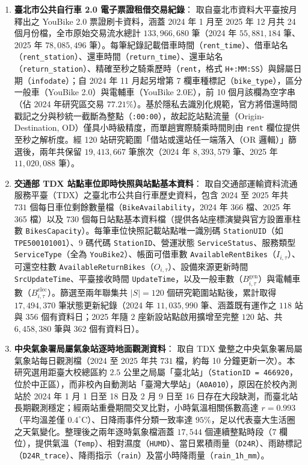 \begin{enumerate}
    \item \textbf{臺北市公共自行車 2.0 電子票證租借交易紀錄}：
    取自臺北市資料大平臺按月釋出之 YouBike 2.0 票證刷卡資料，涵蓋 2024 年 1 月至 2025 年 12 月共 24 個月份檔，全市原始交易流水總計 $133{,}966{,}680$ 筆（2024 年 $55{,}881{,}184$ 筆、2025 年 $78{,}085{,}496$ 筆）。每筆紀錄記載借車時間（\texttt{rent\_time}）、借車站名（\texttt{rent\_station}）、還車時間（\texttt{return\_time}）、還車站名（\texttt{return\_station}）、精確至秒之騎乘歷時（\texttt{rent}，格式 \texttt{H+:MM:SS}）與歸屬日期（\texttt{infodate}）；自 2024 年 11 月起另增第 7 欄車種標記（\texttt{bike\_type}），區分一般車（YouBike 2.0）與電輔車（YouBike 2.0E），前 10 個月該欄為空字串（佔 2024 年研究區交易 $77.21\%$）。基於隱私去識別化規範，官方將借還時間戳記之分與秒統一截斷為整點（\texttt{:00:00}），故起訖站點流量（Origin-Destination, OD）僅具小時級精度，而單趟實際騎乘時間則由 \texttt{rent} 欄位提供至秒之解析度。經 120 站研究範圍「借站或還站任一端落入（OR 邏輯）」篩選後，兩年共保留 $19{,}413{,}667$ 筆旅次（2024 年 $8{,}393{,}579$ 筆、2025 年 $11{,}020{,}088$ 筆）。

    \item \textbf{交通部 TDX 站點車位即時快照與站點基本資料}：
    取自交通部運輸資料流通服務平臺（TDX）之臺北市公共自行車歷史資料，包含 2024 至 2025 年共 $731$ 個每日車位剩餘數量檔（\texttt{BikeAvailability}，2024 年 366 檔、2025 年 365 檔）以及 $730$ 個每日站點基本資料檔（提供各站座標演變與官方設置車柱數 \texttt{BikesCapacity}）。每筆車位快照記載站點唯一識別碼 \texttt{StationUID}（如 \texttt{TPE500101001}）、9 碼代碼 \texttt{StationID}、營運狀態 \texttt{ServiceStatus}、服務類型 \texttt{ServiceType}（全為 \texttt{YouBike2}）、帳面可借車數 \texttt{AvailableRentBikes}（$I_{i,\tau}$）、可還空柱數 \texttt{AvailableReturnBikes}（$O_{i,\tau}$）、設備來源更新時間 \texttt{SrcUpdateTime}、平臺接收時間 \texttt{UpdateTime}，以及一般車數（$B^{\text{gen}}_{i,\tau}$）與電輔車數（$B^{\text{elec}}_{i,\tau}$）。篩選至兩年聯集共 $|S| = 120$ 個研究範圍站點後，累計取得 $17{,}494{,}370$ 筆狀態更新紀錄（2024 年 $11{,}035{,}990$ 筆、涵蓋既有運作之 $118$ 站與 $356$ 個有資料日；2025 年隨 $2$ 座新設站點啟用擴增至完整 $120$ 站、共 $6{,}458{,}380$ 筆與 $362$ 個有資料日）。

    \item \textbf{中央氣象署局屬氣象站逐時地面觀測資料}：
    取自 TDX 彙整之中央氣象署局屬氣象站每日觀測檔（2024 至 2025 年共 $731$ 檔，約每 10 分鐘更新一次）。本研究選用距臺大校總區約 $2.5$ 公里之局屬「臺北站」（\texttt{StationID = 466920}，位於中正區），而非校內自動測站「臺灣大學站」（\texttt{A0A010}），原因在於校內測站於 2024 年 1 月 1 日至 18 日及 2 月 9 日至 16 日存在大段缺測，而臺北站長期觀測穩定；經兩站重疊期間交叉比對，小時氣溫相關係數高達 $r = 0.993$（平均溫差僅 $0.4^\circ\text{C}$）、日降雨事件分類一致率達 $95\%$，足以代表臺大生活圈之天氣變化。整理後之兩年逐時氣象檔涵蓋 $17{,}544$ 個連續整點時段（$7$ 欄位），提供氣溫（\texttt{Temp}）、相對濕度（\texttt{HUMD}）、當日累積雨量（\texttt{D24R}）、雨跡標記（\texttt{D24R\_trace}）、降雨指示（\texttt{rain}）及當小時降雨量（\texttt{rain\_1h\_mm}）。


\end{enumerate}
